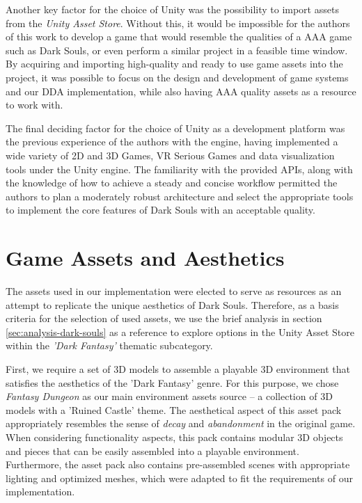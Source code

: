 Another key factor for the choice of Unity was the possibility to import assets from the \emph{Unity Asset Store}. Without this, it would be impossible for the authors of this work to develop a game that would resemble the qualities of a AAA game such as Dark Souls, or even perform a similar project in a feasible time window. By acquiring and importing high-quality and ready to use game assets into the project, it was possible to focus on the design and development of game systems and our DDA implementation, while also having AAA quality assets as a resource to work with.

The final deciding factor for the choice of Unity as a development platform was the previous experience of the authors with the engine, having implemented a wide variety of 2D and 3D Games, VR Serious Games and data visualization tools under the Unity engine. The familiarity with the provided APIs, along with the knowledge of how to achieve a steady and concise workflow permitted the authors to plan a moderately robust architecture and select the appropriate tools to implement the core features of Dark Souls with an acceptable quality.


\section{Game Assets and Aesthetics}

The assets used in our implementation were elected to serve as resources as an attempt to replicate the unique aesthetics of Dark Souls. Therefore, as a basis criteria for the selection of used assets, we use the brief analysis in section \ref{sec:analysis-dark-souls} as a reference to explore options in the Unity Asset Store within the \emph{'Dark Fantasy'} thematic subcategory.

First, we require a set of 3D models to assemble a playable 3D environment that satisfies the aesthetics of the 'Dark Fantasy' genre. For this purpose, we chose \emph{Fantasy Dungeon} as our main environment assets source -- a collection of 3D models with a 'Ruined Castle' theme. The aesthetical aspect of this asset pack appropriately resembles the sense of \emph{decay} and \emph{abandonment} in the original game. When considering functionality aspects, this pack contains modular 3D objects and pieces that can be easily assembled into a playable environment. Furthermore, the asset pack also contains pre-assembled scenes with appropriate lighting and optimized meshes, which were adapted to fit the requirements of our implementation.

